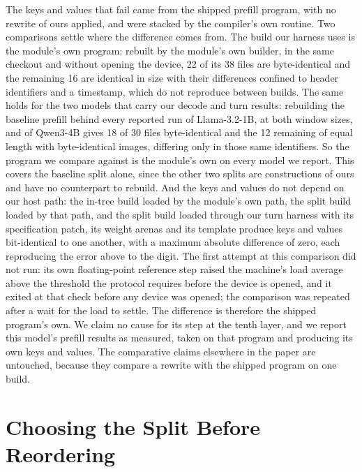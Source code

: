 \documentclass{article}
\begin{document}
The keys and values that fail came from the shipped prefill program, with no rewrite of ours applied, and were
stacked by the compiler's own routine. Two comparisons settle where the difference comes from. The build our harness
uses is the module's own program: rebuilt by the module's own builder, in the same checkout and without opening the
device, 22 of its 38 files are byte-identical and the remaining 16 are identical in size with their differences
confined to header identifiers and a timestamp, which do not reproduce between builds. The same holds for the two
models that carry our decode and turn results: rebuilding the baseline prefill behind every reported run of
Llama-3.2-1B, at both window sizes, and of Qwen3-4B gives 18 of 30 files byte-identical and the 12 remaining of equal
length with byte-identical images, differing only in those same identifiers. So the program we compare against is the
module's own on every model we report. This covers the baseline split alone, since the other two splits are
constructions of ours and have no counterpart to rebuild. And the keys and values do not
depend on our host path: the in-tree build loaded by the module's own path, the split build loaded by that path, and
the split build loaded through our turn harness with its specification patch, its weight arenas and its template
produce keys and values bit-identical to one another, with a maximum absolute difference of zero, each reproducing
the error above to the digit. The first attempt at this comparison did not run: its own floating-point reference step raised the machine's
load average above the threshold the protocol requires before the device is opened, and it exited at that check
before any device was opened; the comparison was repeated after a wait for the load to settle.
The difference is therefore the shipped program's own. We claim no cause for its step at
the tenth layer, and we report this model's prefill results as measured, taken on that program and producing its own
keys and values. The comparative claims elsewhere in the paper are untouched, because they compare a rewrite with the
shipped program on one build.

\section{Choosing the Split Before Reordering}
\label{app:split-first}
\end{document}
